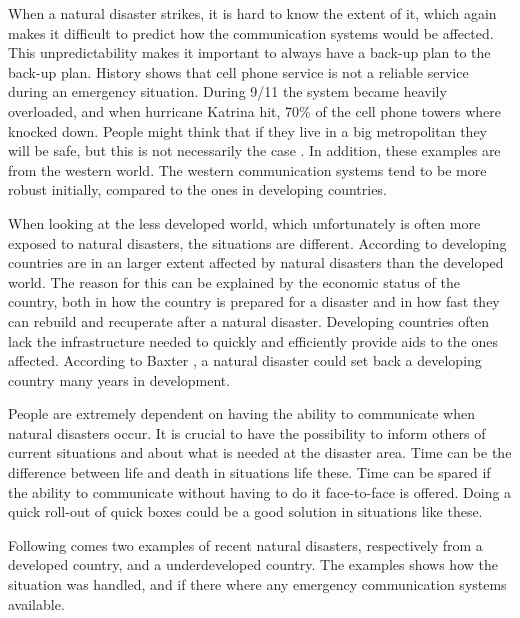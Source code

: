 When a natural disaster strikes, it is hard to know the extent of it, which  again makes it difficult to predict how the communication systems would be affected. This unpredictability makes it important to always have a back-up plan to the back-up plan. History shows that cell phone service is not a reliable service during an emergency situation. During 9/11 the system became heavily overloaded, and when hurricane Katrina hit, 70\% of the cell phone towers where knocked down. People might think that if they live in a big metropolitan they will be safe, but this is not necessarily the case \cite{disasterComm}. In addition, these examples are from the western world. The western communication systems tend to be more robust initially, compared to the ones in developing countries. 

When looking at the less developed world, which unfortunately is often more exposed to natural disasters, the situations are different. According to \cite{DevelopingWorld, 360} developing countries are in an larger extent affected by natural disasters than the developed world. The reason for this can be explained by the economic status of the country, both in how the country is prepared for a disaster and in how fast they can rebuild and recuperate after a natural disaster. Developing countries often lack the infrastructure needed to quickly and efficiently provide aids to the ones affected. According to Baxter \cite{360}, a natural disaster could set back a developing country many years in development.  

People are extremely dependent on having the ability to communicate when natural disasters occur. It is crucial to have the possibility to inform others of current situations and about what is needed at the disaster area. Time can be the difference between life and death in situations life these. Time can be spared if the ability to communicate without having to do it face-to-face is offered. Doing a quick roll-out of \gls{quick} boxes could be a good solution in situations like these. 

Following comes two examples of recent natural disasters, respectively from a developed country, and a underdeveloped country. The examples shows how the situation was handled, and if there where any emergency communication systems available. 

